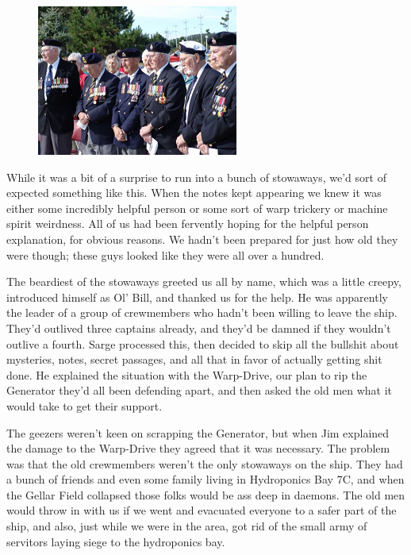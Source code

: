\begin{figure}
	\begin{center}
		\includegraphics[width=\figwidth]{pics/7/28.png}
	\end{center}
\end{figure}
While it was a bit of a surprise to run into a bunch of stowaways, we’d sort of expected something like this. 
When the notes kept appearing we knew it was either some incredibly helpful person or some sort of warp trickery or machine spirit weirdness. 
All of us had been fervently hoping for the helpful person explanation, for obvious reasons. 
We hadn’t been prepared for just how old they were though; 
these guys looked like they were all over a hundred.

The beardiest of the stowaways greeted us all by name, which was a little creepy, introduced himself as Ol’ Bill, and thanked us for the help. 
He was apparently the leader of a group of crewmembers who hadn’t been willing to leave the ship. 
They’d outlived three captains already, and they’d be damned if they wouldn’t outlive a fourth. 
Sarge processed this, then decided to skip all the bullshit about mysteries, notes, secret passages, and all that in favor of actually getting shit done. 
He explained the situation with the Warp-Drive, our plan to rip the Generator they’d all been defending apart, and then asked the old men what it would take to get their support.

The geezers weren’t keen on scrapping the Generator, but when Jim explained the damage to the Warp-Drive they agreed that it was necessary. 
The problem was that the old crewmembers weren’t the only stowaways on the ship. 
They had a bunch of friends and even some family living in Hydroponics Bay 7C, and when the Gellar Field collapsed those folks would be ass deep in daemons. 
The old men would throw in with us if we went and evacuated everyone to a safer part of the ship, and also, just while we were in the area, got rid of the small army of servitors laying siege to the hydroponics bay.

